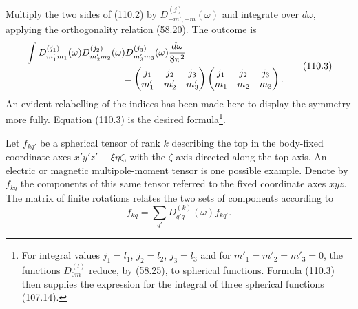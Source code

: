 Multiply the two sides of (110.2) by $D^{(j)}_{-m',-m}(\omega)$ and integrate over $d\omega$, applying the orthogonality relation (58.20). The outcome is
\begin{equation}
 \begin{aligned}
 &\int D^{(j_1)}_{m'_1m_1}(\omega)D^{(j_2)}_{m'_2m_2}(\omega)
 D^{(j_3)}_{m'_3m_3}(\omega)\frac{d\omega}{8\pi^2}={}\\
 &\hspace{35mm}=
 \begin{pmatrix}j_1&j_2&j_3\\m'_1&m'_2&m'_3\end{pmatrix}
 \begin{pmatrix}j_1&j_2&j_3\\m_1&m_2&m_3\end{pmatrix}.
 \end{aligned}
 \tag{110.3}
\end{equation}
An evident relabelling of the indices has been made here to display the symmetry more fully. Equation (110.3) is the desired formula\footnote{For integral values $j_1=l_1$, $j_2=l_2$, $j_3=l_3$ and for $m'_1=m'_2=m'_3=0$, the functions $D^{(l)}_{0m}$ reduce, by (58.25), to spherical functions. Formula (110.3) then supplies the expression for the integral of three spherical functions (107.14).}.

Let $f_{kq'}$ be a spherical tensor of rank $k$ describing the top in the body-fixed coordinate axes $x'y'z'\equiv\xi\eta\zeta$, with the $\zeta$-axis directed along the top axis. An electric or magnetic multipole-moment tensor is one possible example. Denote by $f_{kq}$ the components of this same tensor referred to the fixed coordinate axes $xyz$. The matrix of finite rotations relates the two sets of components according to
\begin{equation}
 f_{kq}=\sum_{q'}D^{(k)}_{q'q}(\omega)f_{kq'}.
 \tag{110.4}
\end{equation}

